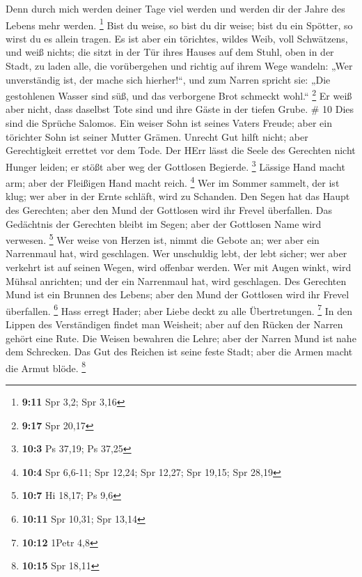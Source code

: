 Denn durch mich werden deiner Tage viel werden und werden dir der Jahre
des Lebens mehr werden. \footnote{\textbf{9:11} Spr 3,2; Spr 3,16}
 Bist du weise, so bist du dir weise; bist du ein Spötter,
so wirst du es allein tragen.  Es ist aber ein törichtes,
wildes Weib, voll Schwätzens, und weiß nichts;  die sitzt
in der Tür ihres Hauses auf dem Stuhl, oben in der Stadt, 
zu laden alle, die vorübergehen und richtig auf ihrem Wege wandeln:
 „Wer unverständig ist, der mache sich hierher!{}``, und
zum Narren spricht sie:  „Die gestohlenen Wasser sind süß,
und das verborgene Brot schmeckt wohl.`` \footnote{\textbf{9:17} Spr
  20,17}  Er weiß aber nicht, dass daselbst Tote sind und
ihre Gäste in der tiefen Grube. \# 10  Dies sind die Sprüche
Salomos. Ein weiser Sohn ist seines Vaters Freude; aber ein törichter
Sohn ist seiner Mutter Grämen.  Unrecht Gut hilft nicht;
aber Gerechtigkeit errettet vor dem Tode.  Der HErr lässt
die Seele des Gerechten nicht Hunger leiden; er stößt aber weg der
Gottlosen Begierde. \footnote{\textbf{10:3} Ps 37,19; Ps 37,25}
 Lässige Hand macht arm; aber der Fleißigen Hand macht
reich. \footnote{\textbf{10:4} Spr 6,6-11; Spr 12,24; Spr 12,27; Spr
  19,15; Spr 28,19}  Wer im Sommer sammelt, der ist klug;
wer aber in der Ernte schläft, wird zu Schanden.  Den Segen
hat das Haupt des Gerechten; aber den Mund der Gottlosen wird ihr Frevel
überfallen.  Das Gedächtnis der Gerechten bleibt im Segen;
aber der Gottlosen Name wird verwesen. \footnote{\textbf{10:7} Hi 18,17;
  Ps 9,6}  Wer weise von Herzen ist, nimmt die Gebote an;
wer aber ein Narrenmaul hat, wird geschlagen.  Wer
unschuldig lebt, der lebt sicher; wer aber verkehrt ist auf seinen
Wegen, wird offenbar werden.  Wer mit Augen winkt, wird
Mühsal anrichten; und der ein Narrenmaul hat, wird geschlagen.
 Des Gerechten Mund ist ein Brunnen des Lebens; aber den
Mund der Gottlosen wird ihr Frevel überfallen. \footnote{\textbf{10:11}
  Spr 10,31; Spr 13,14}  Hass erregt Hader; aber Liebe
deckt zu alle Übertretungen. \footnote{\textbf{10:12} 1Petr 4,8}
 In den Lippen des Verständigen findet man Weisheit; aber
auf den Rücken der Narren gehört eine Rute.  Die Weisen
bewahren die Lehre; aber der Narren Mund ist nahe dem Schrecken.
 Das Gut des Reichen ist seine feste Stadt; aber die Armen
macht die Armut blöde. \footnote{\textbf{10:15} Spr 18,11} 
